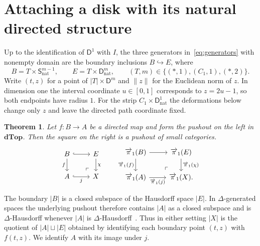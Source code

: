\documentclass[12pt,a4paper]{amsart}
\newtheorem{theorem}{Theorem}[section]
\theoremstyle{definition}
\renewcommand{\vec}{\overrightarrow}
\newcommand{\D}{\mathbf{dTop}}
\newcommand{\rev}[1]{#1_{\mathrm{nat}}}
\newcommand{\cube}[1]{C_{#1}}
\newcommand{\abs}[1]{\lvert#1\rvert}
\newcommand{\PiC}{\vec{\pi}_1}
\begin{document}
\section{Attaching a disk with its natural directed structure}\label{sec:excision}

Up to the identification of $\mathsf{D}^1$ with $I$, the three generators in~\eqref{eq:generators} with nonempty domain are the boundary inclusions $B\hookrightarrow E$, where
\[
 B=T\times\rev{\mathsf{S}^{m-1}},\qquad E=T\times\rev{\mathsf{D}^m},\qquad (T,m)\in\{(*,1),(\cube{1},1),(*,2)\}.
\]
Write $(t,z)$ for a point of $\abs T\times\mathsf{D}^m$ and $\|z\|$ for the Euclidean norm of $z$. In dimension one the interval coordinate $u\in[0,1]$ corresponds to $z=2u-1$, so both endpoints have radius $1$. For the strip $\cube{1}\times\rev{\mathsf{D}^1}$ the deformations below change only $z$ and leave the directed path coordinate fixed.

\begin{theorem}\label{thm:disk-excision}
Let $f\colon B\to A$ be a directed map and form the pushout on the left in $\D$. Then the square on the right is a pushout of small categories.
\[
\begin{tikzcd}
 B\ar[r,hook]\ar[d,"f"']&E\ar[d,"\chi"]\\
 A\ar[r,hook,"j"']&X\ar[ul,phantom,"\ulcorner",very near start]
\end{tikzcd}
\qquad
\begin{tikzcd}
 \PiC(B)\ar[r]\ar[d,"\PiC(f)"']&\PiC(E)\ar[d,"\PiC(\chi)"]\\
 \PiC(A)\ar[r,"\PiC(j)"']&\PiC(X)\ar[ul,phantom,"\ulcorner",very near start].
\end{tikzcd}
\]
\end{theorem}
The boundary $\abs B$ is a closed subspace of the Hausdorff space $\abs E$. In $\Delta$-generated spaces the underlying pushout therefore contains $\abs A$ as a closed subspace and is $\Delta$-Hausdorff whenever $\abs A$ is $\Delta$-Hausdorff~\cite[Proposition~B.15]{leftproperflow}. Thus in either setting $\abs X$ is the quotient of $\abs A\sqcup\abs E$ obtained by identifying each boundary point $(t,z)$ with $f(t,z)$. We identify $A$ with its image under $j$.
\end{document}
